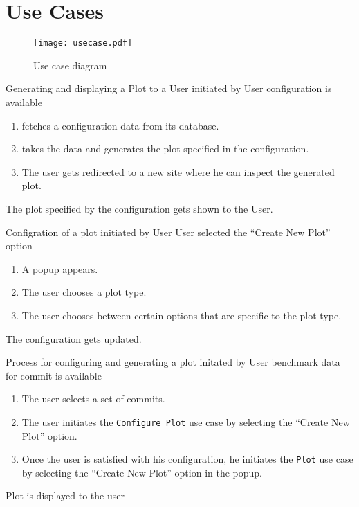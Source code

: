 \section{Use Cases}

\begin{figure}[H]
    \texttt{[image: usecase.pdf]}
    \caption{Use case diagram}
    \label{fig:usecase}
\end{figure}

{Generating and displaying a Plot to a User}
{initiated by User}
{\gls{configuration} is available}
{\begin{enumerate}
    \item \parkview{} fetches a \gls{configuration} data from its database.
    \item \parkview{} takes the data and generates the plot specified in the \gls{configuration}.
    \item The user gets redirected to a new site where he can inspect the generated plot.
\end{enumerate}}
{The plot specified by the \gls{configuration} gets shown to the User.}

\bigskip

{Configration of a \gls{plot}}
{initiated by User}
{User selected the \enquote{Create New Plot} option}
{\begin{enumerate}
    \item A popup appears.
    \item The user chooses a plot type.
    \item The user chooses between certain options that are specific to the plot type.
\end{enumerate}}
{The \gls{configuration} gets updated.}

\bigskip

{Process for configuring and generating a plot}
{initated by User}
{benchmark data for commit is available}
{\begin{enumerate}
    \item The user selects a set of commits.
    \item The user initiates the \texttt{Configure Plot} use case by selecting the \enquote{Create New Plot} option.
    \item Once the user is satisfied with his \gls{configuration}, he initiates the \texttt{Plot} use case by selecting the \enquote{Create New Plot} option in the popup.
\end{enumerate}}
{Plot is displayed to the user}

